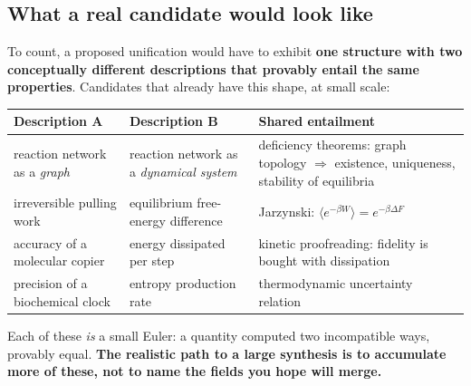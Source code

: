 \subsection{What a real candidate would look like}

\begin{movebox}[title={The shape of a genuine synthesis in this domain}]
To count, a proposed unification would have to exhibit \textbf{one structure with two conceptually
different descriptions that provably entail the same properties}. Candidates that already have this
shape, at small scale:
\begin{center}\small
\begin{tabular}{@{}>{\raggedright\arraybackslash}p{5.2cm}>{\raggedright\arraybackslash}p{5.2cm}>{\raggedright\arraybackslash}p{5.5cm}@{}}
\toprule
\rowcolor{bio!13}
\textbf{\color{bio}Description A} & \textbf{\color{bio}Description B} & \textbf{\color{bio}Shared entailment}\\
\midrule
reaction network as a \emph{graph} & reaction network as a \emph{dynamical system} &
 deficiency theorems: graph topology $\Rightarrow$ existence, uniqueness, stability of equilibria\\
irreversible pulling work & equilibrium free-energy difference &
 Jarzynski: $\langle e^{-\beta W}\rangle = e^{-\beta\Delta F}$\\
accuracy of a molecular copier & energy dissipated per step &
 kinetic proofreading: fidelity is bought with dissipation\\
\rowcolor{bio!6}
precision of a biochemical clock & entropy production rate &
 thermodynamic uncertainty relation\\
\bottomrule
\end{tabular}
\end{center}
\vspace{2pt}
Each of these \emph{is} a small Euler: a quantity computed two incompatible ways, provably equal.
\textbf{The realistic path to a large synthesis is to accumulate more of these, not to name the
fields you hope will merge.}
\end{movebox}
